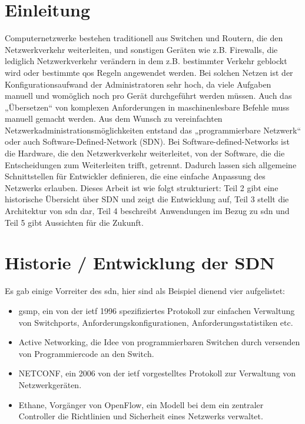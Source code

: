 \documentclass[twoside,12pt]{scrartcl}
\begin{document}
	\section{Einleitung}	
Computernetzwerke bestehen traditionell aus Switchen und Routern, die den Netzwerkverkehr weiterleiten, und sonstigen Geräten wie z.B. Firewalls, die lediglich Netzwerkverkehr verändern in dem z.B. bestimmter Verkehr geblockt wird oder bestimmte qos Regeln angewendet werden. Bei solchen Netzen ist der Konfigurationsaufwand der Administratoren sehr hoch, da viele Aufgaben manuell und womöglich noch pro Gerät durchgeführt werden müssen. Auch das „Übersetzen“ von komplexen Anforderungen in maschinenlesbare Befehle muss manuell gemacht werden.
Aus dem Wunsch zu vereinfachten Netzwerkadministrationsmöglichkeiten entstand das „programmierbare Netzwerk“ oder auch Software-Defined-Network (SDN). Bei Software-defined-Networks ist die Hardware, die den Netzwerkverkehr weiterleitet, von der Software, die die Entscheidungen zum Weiterleiten trifft, getrennt. Dadurch lassen sich allgemeine Schnittstellen für Entwickler definieren, die eine einfache Anpassung des Netzwerks erlauben.
Dieses Arbeit ist wie folgt strukturiert: Teil 2 gibt eine historische Übersicht über SDN und zeigt die Entwicklung auf, Teil 3 stellt die Architektur von \gls{sdn} dar, Teil 4 beschreibt Anwendungen im Bezug zu \gls{sdn} und Teil 5 gibt Aussichten für die Zukunft.
	\newpage
	\section{Historie / Entwicklung der SDN}
	
	Es gab einige Vorreiter des \gls{sdn}, hier sind als Beispiel dienend vier aufgelistet:
	
	\begin{itemize}
		\item \gls{gsmp}, ein von der \gls{ietf} 1996 spezifiziertes Protokoll zur einfachen Verwaltung von Switchports, Anforderungskonfigurationen, Anforderungsstatistiken etc.
		\item Active Networking, die Idee von programmierbaren Switchen durch versenden von Programmiercode an den Switch.
		\item NETCONF, ein 2006 von der \gls{ietf} vorgestelltes Protokoll zur Verwaltung von Netzwerkgeräten.
		\item Ethane, Vorgänger von OpenFlow, ein Modell bei dem ein zentraler Controller die Richtlinien und Sicherheit eines Netzwerks verwaltet.
	\end{itemize}
\end{document}
